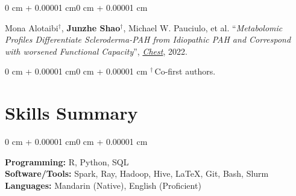 \documentclass[10pt, letterpaper]{article}
\newenvironment{onecolentry}{
    \begin{adjustwidth}{0 cm + 0.00001 cm}{0 cm + 0.00001 cm}
}{\end{adjustwidth}}
\begin{document}
\begin{onecolentry}
Mona Alotaibi$^\dagger$, \textbf{Junzhe Shao}$^\dagger$, Michael W. Pauciulo, et al. ``\textit{Metabolomic Profiles Differentiate Scleroderma-PAH from Idiopathic PAH and Correspond with worsened Functional Capacity}'', \href{https://www.sciencedirect.com/science/article/abs/pii/S0012369222037060}{\textit{Chest}}, 2022.
\end{onecolentry}

\vspace{0.30 cm}

\begin{onecolentry}\footnotesize
$^\dagger$\,Co-first authors.
\end{onecolentry}

\section{Skills Summary}
    \begin{onecolentry}
        \textbf{Programming:} R, Python, SQL\\
        \textbf{Software/Tools:} Spark, Ray, Hadoop, Hive, \LaTeX, Git, Bash, Slurm\\
        \textbf{Languages:} Mandarin (Native), English (Proficient)
    \end{onecolentry}
\end{document}
